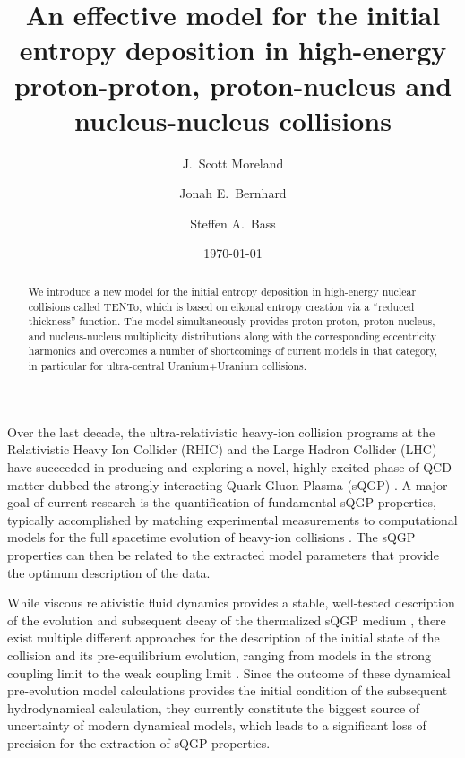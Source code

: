 \documentclass[aps,prc,reprint,amsmath,nofootinbib]{revtex4-1}
\newcommand{\trento}{T\raisebox{-.5ex}{R}ENTo}
\begin{document}
\title{An effective model for the initial entropy deposition in high-energy proton-proton, proton-nucleus and nucleus-nucleus collisions}

\author{J.\ Scott Moreland}
\author{Jonah E.\ Bernhard}
\author{Steffen A.\ Bass}

\date{\today}


\begin{abstract}
We introduce a new model for the initial entropy deposition in high-energy nuclear collisions called \trento, which is based on
eikonal entropy creation via a ``reduced thickness'' function.  
The model simultaneously provides
proton-proton, proton-nucleus, and nucleus-nucleus multiplicity distributions along with  the corresponding eccentricity harmonics and overcomes a number of shortcomings of current models in that category, in particular for ultra-central Uranium+Uranium collisions.
\end{abstract}


\maketitle


Over the last decade, the ultra-relativistic heavy-ion collision programs at the Relativistic Heavy Ion Collider (RHIC) and the Large Hadron Collider (LHC) have succeeded in producing and exploring a novel, highly excited phase of QCD matter dubbed the strongly-interacting Quark-Gluon Plasma (sQGP)
\cite{Arsene:2004fa,Adcox:2004mh,Back:2004je,Adams:2005dq,Gyulassy:2004zy,Muller:2006ee,Muller:2012zq}.
A major goal of current research is the quantification of fundamental sQGP properties, typically accomplished by matching experimental measurements to computational models for the full spacetime evolution of heavy-ion collisions \cite{Petersen:2010zt,Novak:2013bqa}. The sQGP properties can then be related to the extracted model parameters that provide the optimum description of the data.

While viscous relativistic fluid dynamics provides a stable, well-tested description of the evolution and subsequent decay of the thermalized sQGP medium \cite{Baier:2006gy,Song:2007ux,Luzum:2008cw,Schenke:2010rr,Shen:2011eg,Shen:2014vra}, there exist multiple different approaches for the description of the initial state of the collision and its pre-equilibrium evolution, ranging from models in the strong coupling limit to the weak coupling limit \cite{Schenke:2012wb,vanderSchee:2013pia,Berges:2014yta,Kurkela:2014tea}. Since the outcome of these dynamical pre-evolution model calculations provides the initial condition of the subsequent hydrodynamical calculation, they currently constitute the biggest source of uncertainty  \cite{Luzum:2008cw,Song:2010mg,Shen:2014vra} of modern dynamical models, which leads to a significant loss of precision for the extraction of sQGP properties.
\end{document}
